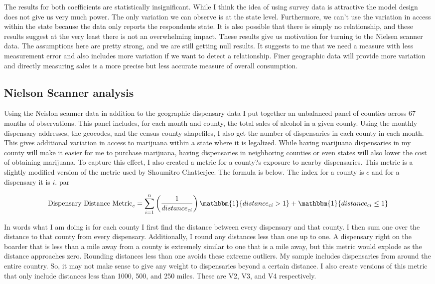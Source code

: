 \documentclass[11pt]{article}
\begin{document}
The results for both coefficients are statistically insignificant. While I think the idea of using survey data is attractive the model design does not give us very much power. The only variation we can observe is at the state level. Furthermore, we can't use the variation in access within the state because the data only reports the respondents state. It is also possible that there is simply no relationship, and these results suggest at the very least there is not an overwhelming impact. These results give us motivation for turning to the Nielsen scanner data.  The assumptions here are pretty strong, and we are still getting null results. It suggests to me that we need a measure with less measurement error and also includes more variation if we want to detect a relationship. Finer geographic data will provide more variation and directly measuring sales is a more precise but less accurate measure of overall consumption. 


\subsection{Nielson Scanner analysis}

Using the Neislon scanner data in addition to the geographic dispensary data I put together an unbalanced panel of counties across 67 months of observations. This panel includes, for each month and county, the total sales of alcohol in a given county. Using the monthly dispensary addresses, the geocodes, and the census county shapefiles, I also get the number of dispensaries in each county in each month. This gives additional variation in access to marijuana within a state where it is legalized. While having marijuana dispensaries in my county will make it easier for me to purchase marijuana, having dispensaries in neighboring counties or even states will also lower the cost of obtaining marijuana. To capture this effect, I also created a metric for a county?s exposure to nearby dispensaries. This metric is a slightly modified version of the metric used by Shoumitro Chatterjee. \cite{Shoumitro} The formula is below. The index for a county is $c$ and for a dispensary it is $i$. par

$$ \text{Dispensary Distance Metric}_c = \sum_{i=1}^{n} \left( \frac{1}{distance_{ci}}\right)\mathbbm{1} \{distance_{ci} > 1 \} + \mathbbm{1}\{distance_{ci} \le 1 \} 
$$

In words what I am doing is for each county I first find the distance between every dispensary and that county. I then sum one over the distance to that county from every dispensary. Additionally, I round any distances less than one up to one. A dispensary right on the boarder that is less than a mile away from a county is extremely similar to one that is a mile away, but this metric would explode as the distance approaches zero. Rounding distances less than one avoids these extreme outliers. My sample includes dispensaries from around the entire country. So, it may not make sense to give any weight to dispensaries beyond a certain distance. I also create versions of this metric that only include distances less than 1000, 500, and 250 miles. These are V2, V3, and V4 respectively. \par 
 
\end{document}

